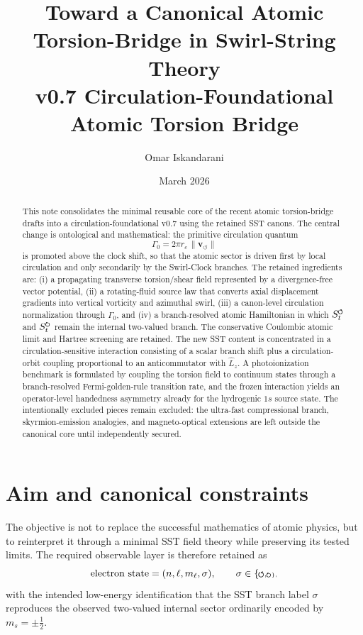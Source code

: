 \documentclass[11pt,a4paper]{article}
\title{Toward a Canonical Atomic Torsion-Bridge in Swirl-String Theory\\
\large v0.7 Circulation-Foundational Atomic Torsion Bridge}
\author{Omar Iskandarani}
\date{March 2026}
\newcommand{\swirlarrow}{\mathchoice{\mkern-2mu\scriptstyle\boldsymbol{\circlearrowleft}}{\mkern-2mu\scriptstyle\boldsymbol{\circlearrowleft}}{\mkern-2mu\scriptscriptstyle\boldsymbol{\circlearrowleft}}{\mkern-2mu\scriptscriptstyle\boldsymbol{\circlearrowleft}}}
\newcommand{\swirlarrowcw}{\mathchoice{\mkern-2mu\scriptstyle\boldsymbol{\circlearrowright}}{\mkern-2mu\scriptstyle\boldsymbol{\circlearrowright}}{\mkern-2mu\scriptscriptstyle\boldsymbol{\circlearrowright}}{\mkern-2mu\scriptscriptstyle\boldsymbol{\circlearrowright}}}
\newcommand{\SwirlClock}{S_t^{\swirlarrow}}
\newcommand{\SwirlClockcw}{S_t^{\swirlarrowcw}}
\begin{document}
\maketitle

\begin{abstract}
This note consolidates the minimal reusable core of the recent atomic torsion-bridge drafts into a circulation-foundational v0.7 using the retained SST canons. The central change is ontological and mathematical: the primitive circulation quantum
\[
\Gamma_0 = 2\pi r_c\,\lVert \mathbf{v}_{\!\boldsymbol{\circlearrowleft}}\rVert
\]
is promoted above the clock shift, so that the atomic sector is driven first by local circulation and only secondarily by the Swirl-Clock branches. The retained ingredients are: (i) a propagating transverse torsion/shear field represented by a divergence-free vector potential, (ii) a rotating-fluid source law that converts axial displacement gradients into vertical vorticity and azimuthal swirl, (iii) a canon-level circulation normalization through $\Gamma_0$, and (iv) a branch-resolved atomic Hamiltonian in which $\SwirlClock$ and $\SwirlClockcw$ remain the internal two-valued branch. The conservative Coulombic atomic limit and Hartree screening are retained. The new SST content is concentrated in a circulation-sensitive interaction consisting of a scalar branch shift plus a circulation-orbit coupling proportional to an anticommutator with $\hat L_z$. A photoionization benchmark is formulated by coupling the torsion field to continuum states through a branch-resolved Fermi-golden-rule transition rate, and the frozen interaction yields an operator-level handedness asymmetry already for the hydrogenic $1s$ source state. The intentionally excluded pieces remain excluded: the ultra-fast compressional branch, skyrmion-emission analogies, and magneto-optical extensions are left outside the canonical core until independently secured.
\end{abstract}

\section{Aim and canonical constraints}
The objective is not to replace the successful mathematics of atomic physics, but to reinterpret it through a minimal SST field theory while preserving its tested limits. The required observable layer is therefore retained as
\begin{equation}
\label{eq:state-labels}
\text{electron state}=(n,\ell,m_\ell,\sigma),
\qquad
\sigma\in\{\swirlarrow,\swirlarrowcw\},
\end{equation}
with the intended low-energy identification that the SST branch label $\sigma$ reproduces the observed two-valued internal sector ordinarily encoded by $m_s=\pm \tfrac12$.
\end{document}
